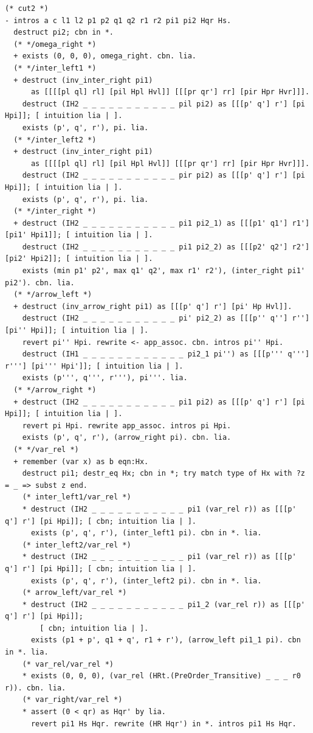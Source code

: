 \documentclass[10pt,a4paper]{article}
\begin{document}
\begin{lstlisting}
(* cut2 *)
- intros a c l1 l2 p1 p2 q1 q2 r1 r2 pi1 pi2 Hqr Hs.
  destruct pi2; cbn in *.
  (* */omega_right *)
  + exists (0, 0, 0), omega_right. cbn. lia.
  (* */inter_left1 *)
  + destruct (inv_inter_right pi1)
      as [[[[pl ql] rl] [pil Hpl Hvl]] [[[pr qr'] rr] [pir Hpr Hvr]]].
    destruct (IH2 _ _ _ _ _ _ _ _ _ _ _ pil pi2) as [[[p' q'] r'] [pi Hpi]]; [ intuition lia | ].
    exists (p', q', r'), pi. lia.
  (* */inter_left2 *)
  + destruct (inv_inter_right pi1)
      as [[[[pl ql] rl] [pil Hpl Hvl]] [[[pr qr'] rr] [pir Hpr Hvr]]].
    destruct (IH2 _ _ _ _ _ _ _ _ _ _ _ pir pi2) as [[[p' q'] r'] [pi Hpi]]; [ intuition lia | ].
    exists (p', q', r'), pi. lia.
  (* */inter_right *)
  + destruct (IH2 _ _ _ _ _ _ _ _ _ _ _ pi1 pi2_1) as [[[p1' q1'] r1'] [pi1' Hpi1]]; [ intuition lia | ].
    destruct (IH2 _ _ _ _ _ _ _ _ _ _ _ pi1 pi2_2) as [[[p2' q2'] r2'] [pi2' Hpi2]]; [ intuition lia | ].
    exists (min p1' p2', max q1' q2', max r1' r2'), (inter_right pi1' pi2'). cbn. lia.
  (* */arrow_left *)
  + destruct (inv_arrow_right pi1) as [[[p' q'] r'] [pi' Hp Hvl]].
    destruct (IH2 _ _ _ _ _ _ _ _ _ _ _ pi' pi2_2) as [[[p'' q''] r''] [pi'' Hpi]]; [ intuition lia | ].
    revert pi'' Hpi. rewrite <- app_assoc. cbn. intros pi'' Hpi.
    destruct (IH1 _ _ _ _ _ _ _ _ _ _ _ _ pi2_1 pi'') as [[[p''' q'''] r'''] [pi''' Hpi']]; [ intuition lia | ].
    exists (p''', q''', r'''), pi'''. lia.
  (* */arrow_right *)
  + destruct (IH2 _ _ _ _ _ _ _ _ _ _ _ pi1 pi2) as [[[p' q'] r'] [pi Hpi]]; [ intuition lia | ].
    revert pi Hpi. rewrite app_assoc. intros pi Hpi.
    exists (p', q', r'), (arrow_right pi). cbn. lia.
  (* */var_rel *)
  + remember (var x) as b eqn:Hx.
    destruct pi1; destr_eq Hx; cbn in *; try match type of Hx with ?z = _ => subst z end.
    (* inter_left1/var_rel *)
    * destruct (IH2 _ _ _ _ _ _ _ _ _ _ _ pi1 (var_rel r)) as [[[p' q'] r'] [pi Hpi]]; [ cbn; intuition lia | ].
      exists (p', q', r'), (inter_left1 pi). cbn in *. lia.
    (* inter_left2/var_rel *)
    * destruct (IH2 _ _ _ _ _ _ _ _ _ _ _ pi1 (var_rel r)) as [[[p' q'] r'] [pi Hpi]]; [ cbn; intuition lia | ].
      exists (p', q', r'), (inter_left2 pi). cbn in *. lia.
    (* arrow_left/var_rel *)
    * destruct (IH2 _ _ _ _ _ _ _ _ _ _ _ pi1_2 (var_rel r)) as [[[p' q'] r'] [pi Hpi]];
        [ cbn; intuition lia | ].
      exists (p1 + p', q1 + q', r1 + r'), (arrow_left pi1_1 pi). cbn in *. lia.
    (* var_rel/var_rel *)
    * exists (0, 0, 0), (var_rel (HRt.(PreOrder_Transitive) _ _ _ r0 r)). cbn. lia.
    (* var_right/var_rel *)
    * assert (0 < qr) as Hqr' by lia.
      revert pi1 Hs Hqr. rewrite (HR Hqr') in *. intros pi1 Hs Hqr.

\end{lstlisting}
\end{document}
